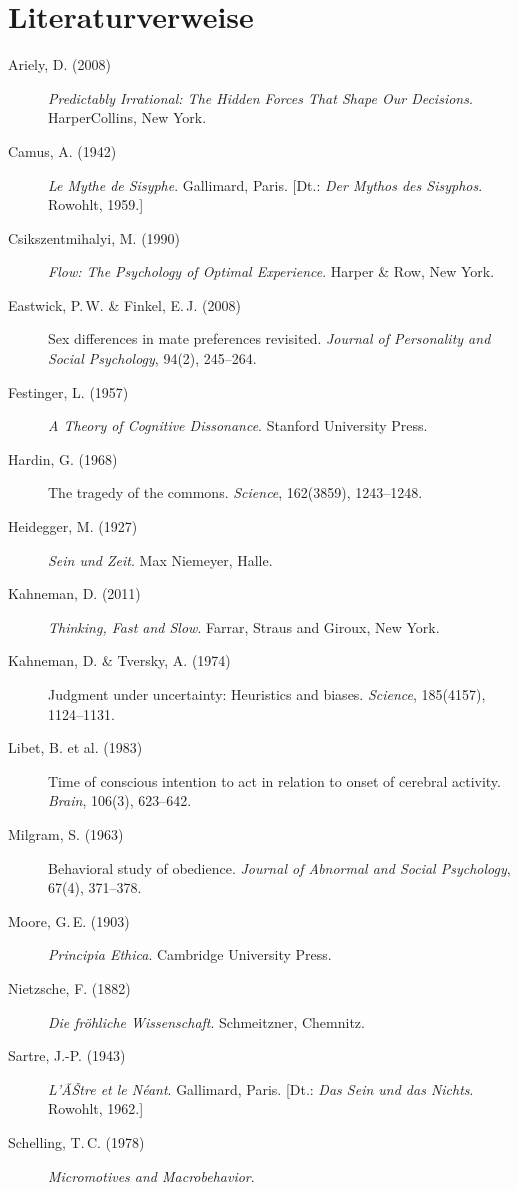 ﻿\documentclass[12pt, a4paper]{article}
\begin{document}
\section*{Literaturverweise}

\begin{description}
  \item[Ariely, D. (2008)] \textit{Predictably Irrational: The Hidden Forces
    That Shape Our Decisions}. HarperCollins, New York.
  \item[Camus, A. (1942)] \textit{Le Mythe de Sisyphe}. Gallimard, Paris.
    [Dt.: \textit{Der Mythos des Sisyphos}. Rowohlt, 1959.]
  \item[Csikszentmihalyi, M. (1990)] \textit{Flow: The Psychology of Optimal
    Experience}. Harper \& Row, New York.
  \item[Eastwick, P.\,W. \& Finkel, E.\,J. (2008)] Sex differences in mate
    preferences revisited. \textit{Journal of Personality and Social Psychology},
    94(2), 245--264.
  \item[Festinger, L. (1957)] \textit{A Theory of Cognitive Dissonance}.
    Stanford University Press.
  \item[Hardin, G. (1968)] The tragedy of the commons. \textit{Science},
    162(3859), 1243--1248.
  \item[Heidegger, M. (1927)] \textit{Sein und Zeit}. Max Niemeyer, Halle.
  \item[Kahneman, D. (2011)] \textit{Thinking, Fast and Slow}. Farrar, Straus
    and Giroux, New York.
  \item[Kahneman, D. \& Tversky, A. (1974)] Judgment under uncertainty:
    Heuristics and biases. \textit{Science}, 185(4157), 1124--1131.
  \item[Libet, B. et al. (1983)] Time of conscious intention to act in relation
    to onset of cerebral activity. \textit{Brain}, 106(3), 623--642.
  \item[Milgram, S. (1963)] Behavioral study of obedience. \textit{Journal of
    Abnormal and Social Psychology}, 67(4), 371--378.
  \item[Moore, G.\,E. (1903)] \textit{Principia Ethica}. Cambridge University Press.
  \item[Nietzsche, F. (1882)] \textit{Die fröhliche Wissenschaft}. Schmeitzner,
    Chemnitz.
  \item[Sartre, J.-P. (1943)] \textit{L'ÃŠtre et le Néant}. Gallimard, Paris.
    [Dt.: \textit{Das Sein und das Nichts}. Rowohlt, 1962.]
  \item[Schelling, T.\,C. (1978)] \textit{Micromotives and Macrobehavior}.

\end{description}
\end{document}
